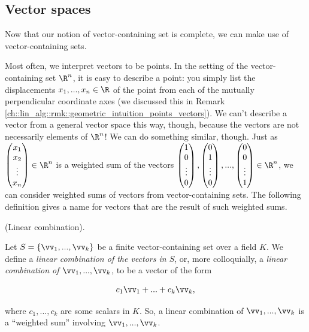 \subsection*{Vector spaces}

Now that our notion of vector-containing set is complete, we can make use of vector-containing sets. 

Most often, we interpret vectors to be points. In the setting of the vector-containing set $\R^n$, it is easy to describe a point: you simply list the displacements $x_1, ..., x_n \in \R$ of the point from each of the mutually perpendicular coordinate axes (we discussed this in Remark \ref{ch::lin_alg::rmk::geometric_intuition_points_vectors}). We can't describe a vector from a general vector space this way, though, because the vectors are not necessarily elements of $\R^n$! We can do something similar, though. Just as $\begin{pmatrix} x_1 \\ x_2 \\ \vdots \\ x_n \end{pmatrix} \in \R^n$ is a weighted sum of the vectors $\begin{pmatrix} 1 \\ 0 \\ \vdots \\ 0 \end{pmatrix}, \begin{pmatrix} 0 \\ 1 \\ \vdots \\ 0 \end{pmatrix}, ..., \begin{pmatrix} 0 \\ 0 \\ \vdots \\ 1 \end{pmatrix} \in \R^n$, we can consider weighted sums of vectors from vector-containing sets. The following definition gives a name for vectors that are the result of such weighted sums.

\begin{defn}
    (Linear combination).
    
    Let $S = \{\vv_1, ..., \vv_k\}$ be a finite vector-containing set over a field $K$. We define a \textit{linear combination of the vectors in $S$}, or, more colloquially, a \textit{linear combination of $\vv_1, ..., \vv_k$}, to be a vector of the form
        
    \begin{align*}
        c_1 \vv_1 + ... + c_k \vv_k,
    \end{align*}
    
    where $c_1, ..., c_k$ are some scalars in $K$. So, a linear combination of $\vv_1, ..., \vv_k$ is a ``weighted sum'' involving $\vv_1, ..., \vv_k$.
\end{defn}

